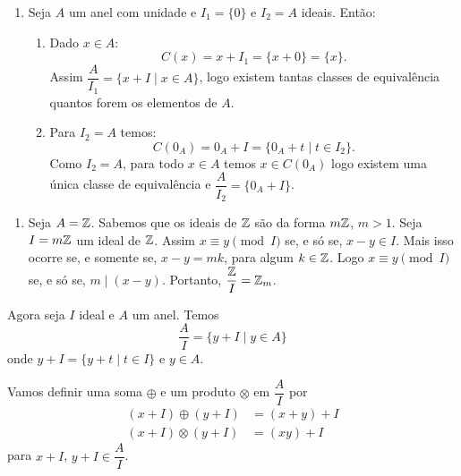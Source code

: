 \documentclass{beamer}
\begin{document}
    \begin{frame}
        \begin{exemplos}
            \begin{enumerate}[label={\arabic*})]
                \item Seja $A$ um anel com unidade e $I_{1} = \{0\}$ e $I_{2} = A$ ideais. Ent\~ao:
                \begin{enumerate}[label={\roman*})]
                    \item Dado $x \in A$:
                    \[
                        C(x) = x + I_{1} = \{x + 0\} = \{x\}.
                    \]
                    Assim $\dfrac{A}{I_{1}} = \{x + I \mid x \in A\}$, logo existem tantas classes de equival{\^e}ncia quantos forem os elementos de $A$.

                    \item Para $I_{2} = A$ temos:
                    \[
                        C(0_A) = 0_A + I = \{0_A + t \mid t \in I_{2}\}.
                    \]
                    Como $I_2 = A$, para todo $x \in A$ temos $x \in C(0_A)$ logo existem uma \'unica classe de equival\^encia
                    e $\dfrac{A}{I_{2}} = \{0_{A} + I\}$.
                \end{enumerate}
                \seti
            \end{enumerate}
        \end{exemplos}
    \end{frame}

    \begin{frame}
        \begin{exemplos}
            \begin{enumerate}[label={\arabic*})]
                \conti

                \item Seja $A = \mathbb{Z}$. Sabemos que os ideais de $\mathbb{Z}$ s{\~a}o da forma $m\mathbb{Z}$, $m > 1$. Seja $I = m\mathbb{Z}$ um ideal de $\mathbb{Z}$. Assim $x\equiv y \pmod I$ se, e s\'o se, $x - y \in I$. Mais isso ocorre se, e somente se, $x - y = mk $, para algum $k \in \mathbb{Z}$. Logo $x\equiv y \pmod I$ se, e s\'o se, $m\mid (x - y)$. Portanto, $\dfrac{\mathbb{Z}}{I} = \mathbb{Z}_m$.
            \end{enumerate}
        \end{exemplos}
    \end{frame}

    \begin{frame}
        Agora seja $I$ ideal e $A$ um anel. Temos
        \[
            \dfrac{A}{I} = \{y + I \mid y \in A\}
        \]
        onde $y + I = \{y + t \mid t \in I\}$ e $y \in A$.

        Vamos definir uma soma $\oplus$ e um produto $\otimes$ em $\dfrac{A}{I}$ por
        \begin{align*}
            (x + I)\oplus(y + I) &= (x + y) + I\\
            (x + I)\otimes(y + I) &= (xy) + I
        \end{align*}
        para $x + I$, $y + I \in \dfrac{A}{I}$.
    \end{frame}
\end{document}
